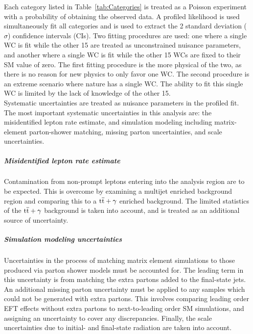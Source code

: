 \documentclass[12pt]{article}
\begin{document}

Each category listed in Table~\ref{tab:Categories} is treated as a Poisson experiment with a probability of obtaining the observed data. A profiled likelihood is used simultaneously fit all categories and is used to extract the 2 standard deviation ($\sigma$) confidence intervals (CIs). Two fitting procedures are used: one where a single WC is fit while the other 15 are treated as unconstrained nuisance parameters, and another where a single WC is fit while the other 15 WCs are fixed to their SM value of zero. The first fitting procedure is the more physical of the two, as there is no reason for new physics to only favor one WC. The second procedure is an extreme scenario where nature has a single WC. The ability to fit this single WC is limited by the lack of knowledge of the other 15.\\

Systematic uncertainties are treated as nuisance parameters in the profiled fit. The most important systematic uncertainties in this analysis are: the misidentified lepton rate estimate, and simulation modeling including  matrix-element parton-shower matching, missing parton uncertainties, and scale uncertainties.

\subparagraph{Misidentified lepton rate estimate}

Contamination from non-prompt leptons entering into the analysis region are to be expected. This is overcome by examining a multijet enriched background region and comparing this to a $\mathrm{t\overline{t}}+\gamma$ enriched background. The limited statistics of the $\mathrm{t\overline{t}}+\gamma$ background is taken into account, and is treated as an additional source of uncertainty.

\subparagraph{Simulation modeling uncertainties}

Uncertainties in the process of matching matrix element simulations to those produced via parton shower models must be accounted for. The leading term in this uncertainty is from matching the extra partons added to the final-state jets. An additional missing parton uncertainty must be applied to any samples which could not be generated with extra partons. This involves comparing leading order EFT effects without extra partons to next-to-leading order SM simulations, and assigning an uncertainty to cover any discrepancies. Finally, the scale uncertainties due to initial- and final-state radiation are taken into account.
\end{document}
